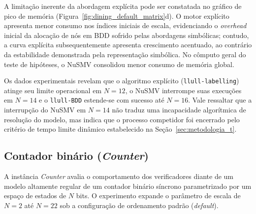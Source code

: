 \documentclass[cic,tc]{infufrgs}
\begin{document}
	A limitação inerente da abordagem explícita pode ser constatada no gráfico de pico de memória (Figura~\ref{fig:dining_default_matrix}d). O motor explícito apresenta menor consumo nos índices iniciais de escala, evidenciando o \textit{overhead} inicial da alocação de nós em BDD sofrido pelas abordagens simbólicas; contudo, a curva explícita subsequentemente apresenta crescimento acentuado, ao contrário da estabilidade demonstrada pela representação simbólica. No cômputo geral do teste de hipóteses, o NuSMV consolidou menor consumo de memória global. 
	
	Os dados experimentais revelam que o algoritmo explícito (\texttt{llull-labelling}) atinge seu limite operacional em $N = 12$, o NuSMV interrompe suas execuções em $N = 14$ e o \texttt{llull-BDD} estende-se com sucesso até $N = 16$. Vale ressaltar que a interrupção do NuSMV em $N=14$ não traduz uma incapacidade algorítmica de resolução do modelo, mas indica que o processo competidor foi encerrado pelo critério de tempo limite dinâmico estabelecido na Seção~\ref{sec:metodologia_t}.
	
	\subsection{Contador binário (\textit{Counter})}
	\label{sec:res_counter}
	
	A instância \textit{Counter} avalia o comportamento dos verificadores diante de um modelo altamente regular de um contador binário síncrono parametrizado por um espaço de estados de $N$ bits. O experimento expande o parâmetro de escala de $N=2$ até $N=22$ sob a configuração de ordenamento padrão (\textit{default}).
	
\end{document}
